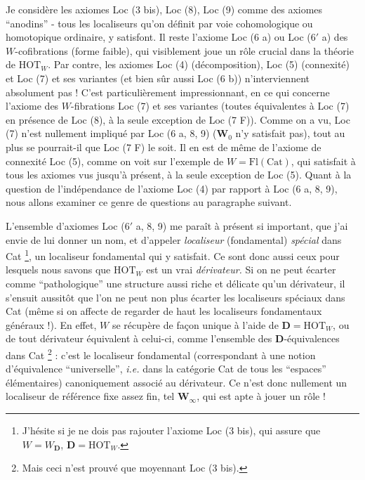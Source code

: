 \documentclass[11pt]{article}
\newcommand{\msp}[1]{\marginpar{\footnotesize [#1]}}
\begin{document}
Je considère les axiomes Loc (3 bis), Loc (8), Loc (9) comme des axiomes ``anodins'' - tous les localiseurs qu'on définit par voie cohomologique ou homotopique ordinaire, y satisfont. Il reste l'axiome Loc (6 a) ou Loc (6$'$ a) des $W$-cofibrations (forme faible),
\msp{page 120}
qui visiblement joue un rôle crucial dans la théorie de $\mathrm{HOT}_W$. Par contre, les axiomes Loc (4) (décomposition), Loc (5) (connexité) et Loc (7) et ses variantes (et bien sûr aussi Loc (6 b)) n'interviennent absolument pas ! C'est particulièrement impressionnant, en ce qui concerne l'axiome des $W$-fibrations Loc (7) et ses variantes (toutes équivalentes à Loc (7) en présence de Loc (8), à la seule exception de Loc (7 F)). Comme on a vu, Loc (7) n'est nullement impliqué par Loc (6 a, 8, 9) ($\mathbf{W}_0$ n'y satisfait pas), tout au plus se pourrait-il que Loc (7 F) le soit. Il en est de même de l'axiome de connexité Loc (5), comme on voit sur l'exemple de $W=\mathrm{Fl}(\mathrm{Cat})$, qui satisfait à tous les axiomes vus jusqu'à présent, à la seule exception
\msp{page 121}
de Loc (5). Quant à la question de l'indépendance de l'axiome Loc (4) par rapport à Loc (6 a, 8, 9), nous allons examiner ce genre de questions au paragraphe suivant.

L'ensemble d'axiomes Loc (6$'$ a, 8, 9) me paraît à présent si important, que j'ai envie de lui donner un nom, et d'appeler \textit{localiseur} (fondamental) \textit{spécial} dans Cat \footnote[57]{J'hésite si je ne dois pas rajouter l'axiome Loc (3 bis), qui assure que $W=W_{\mathbf{D}}$, $\mathbf{D}=\mathrm{HOT}_W$.}, un localiseur fondamental qui y satisfait. Ce sont donc aussi ceux pour lesquels nous savons que $\mathrm{HOT}_W$ est un vrai \textit{dérivateur.} Si on ne peut écarter comme ``pathologique'' une structure aussi riche et délicate qu'un dérivateur, il s'ensuit aussitôt que l'on ne peut non plus écarter les localiseurs spéciaux dans Cat (même si on affecte de regarder de haut les
\msp{page 122}
localiseurs fondamentaux généraux !). En effet, $W$ se récupère de façon unique à l'aide de $\mathbf{D}=\mathrm{HOT}_W$, ou de tout dérivateur équivalent à celui-ci, comme l'ensemble des $\mathbf{D}$-équivalences dans Cat \footnote[58]{Mais ceci n'est prouvé que moyennant Loc (3 bis).} : c'est le localiseur fondamental (correspondant à une notion d'équivalence ``universelle'', \textit{i.e.} dans la catégorie Cat de tous les ``espaces'' élémentaires) canoniquement associé au dérivateur. Ce n'est donc nullement un localiseur de référence fixe assez fin, tel $\mathbf{W}_\infty$, qui est apte à jouer un rôle !
\end{document}
